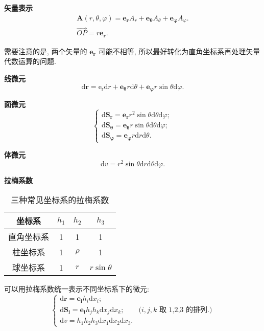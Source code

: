 \textbf{矢量表示}
\begin{gather}
    \bm{A}(r,\theta,\varphi)=\bm{e_r}A_r+\bm{e_\theta}A_\theta+\bm{e_\varphi}A_\varphi. \\
    \overrightarrow{OP}=r\bm{e_r}.
\end{gather}

需要注意的是, 两个矢量的 $\bm{e_r}$ 可能不相等, 所以最好转化为直角坐标系再处理矢量代数运算的问题.

\textbf{线微元}
\begin{equation}
    \mathrm{d}\bm{r}=\mathrm{e_r}\mathrm{d}r+\bm{e_\theta}r\mathrm{d}\theta+\bm{e_\varphi}r\sin\theta\mathrm{d}\varphi.
\end{equation}

\textbf{面微元}
\begin{equation}
    \begin{cases}
        \mathrm{d}\bm{S_r}=\bm{e_r}r^2\sin\theta\mathrm{d}\theta\mathrm{d}\varphi;         \\
        \mathrm{d}\bm{S_\theta}=\bm{e_\theta}r\sin\theta\mathrm{d}\theta\mathrm{d}\varphi; \\
        \mathrm{d}\bm{S_\varphi}=\bm{e_\varphi}r\mathrm{d}r\mathrm{d}\theta.
    \end{cases}
\end{equation}

\textbf{体微元}
\begin{equation}
    \mathrm{d}v=r^2\sin\theta\mathrm{d}r\mathrm{d}\theta\mathrm{d}\varphi.
\end{equation}

\textbf{拉梅系数}

\begin{table}[H]
    \centering
    \caption{三种常见坐标系的拉梅系数}
    \begin{tabular}{cccc} \toprule
        \textbf{坐标系} & $h_1$ & $h_2$  & $h_3$         \\\midrule
        直角坐标系        & 1     & 1      & 1             \\
        柱坐标系         & 1     & $\rho$ & 1             \\
        球坐标系         & 1     & $r$    & $r\sin\theta$ \\\bottomrule
    \end{tabular}
\end{table}

可以用拉梅系数统一表示不同坐标系下的微元:
\begin{equation}
    \begin{cases}
        \mathrm{d}\bm{r}=\bm{e_i}h_i\mathrm{d}x_i;                                                   \\
        \mathrm{d}\bm{S_i}=\bm{e_i}h_jh_k\mathrm{d}x_j\mathrm{d}x_k; & \text{($i,j,k$ 取 1,2,3 的排列.)} \\
        \mathrm{d}v=h_1h_2h_3\mathrm{d}x_1\mathrm{d}x_2\mathrm{d}x_3.
    \end{cases}
\end{equation}
